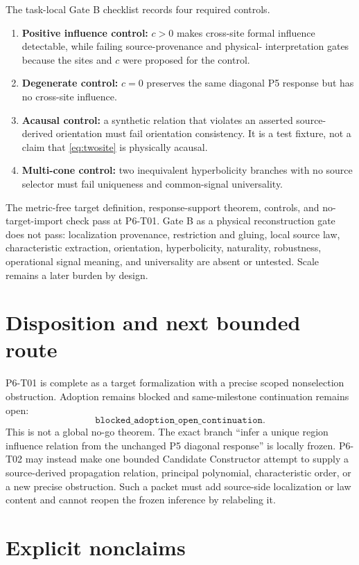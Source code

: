 \documentclass[11pt]{article}
\begin{document}
The task-local Gate B checklist records four required controls.
\begin{enumerate}
  \item \textbf{Positive influence control:} \(c>0\) makes cross-site formal
  influence detectable, while failing source-provenance and physical-
  interpretation gates because the sites and \(c\) were proposed for the
  control.
  \item \textbf{Degenerate control:} \(c=0\) preserves the same diagonal P5
  response but has no cross-site influence.
  \item \textbf{Acausal control:} a synthetic relation that violates an
  asserted source-derived orientation must fail orientation consistency.  It
  is a test fixture, not a claim that \eqref{eq:twosite} is physically
  acausal.
  \item \textbf{Multi-cone control:} two inequivalent hyperbolicity branches
  with no source selector must fail uniqueness and common-signal
  universality.
\end{enumerate}

The metric-free target definition, response-support theorem, controls, and
no-target-import check pass at P6-T01.  Gate B as a physical reconstruction
gate does not pass: localization provenance, restriction and gluing, local
source law, characteristic extraction, orientation, hyperbolicity,
naturality, robustness, operational signal meaning, and universality are
absent or untested.  Scale remains a later burden by design.

\section{Disposition and next bounded route}

P6-T01 is complete as a target formalization with a precise scoped
nonselection obstruction.  Adoption remains blocked and same-milestone
continuation remains open:
\[
\texttt{blocked\_adoption\_open\_continuation}.
\]
This is not a global no-go theorem.
The exact branch ``infer a unique region influence relation from the
unchanged P5 diagonal response'' is locally frozen.  P6-T02 may instead make
one bounded Candidate Constructor attempt to supply a source-derived
propagation relation, principal polynomial, characteristic order, or a new
precise obstruction.  Such a packet must add source-side localization or law
content and cannot reopen the frozen inference by relabeling it.

\section{Explicit nonclaims}
\end{document}
